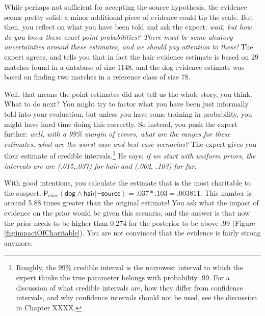 \documentclass[
  10pt,
  dvipsnames,enabledeprecatedfontcommands]{scrartcl}
\newcommand{\s}[1]{\mbox{$\mathsf{#1}$}}
\begin{document}
While perhaps not sufficient for accepting the source
hypothesis,
the evidence seems pretty solid: a minor additional piece of evidence
could tip the scale. But then, you reflect on what you have been told
and ask the expect:
\emph{wait, but how do you know these exact point probabilities? There must be some aleatory uncertainties around these estimates, and we should pay attention to these!}
The expert agrees, and tells you that in fact the hair evidence estimate
is based on 29 matches found in a database of size 1148, and the dog
evidence estimate was based on finding two matches in a reference class
of size 78.

Well, that means the point estimates did not tell us the whole story,
you think. What to do next?
You might try to factor what you have been just informally told into
your evaluation, but unless you have some training in probability, you
might have hard time doing this correctly. So instead, you push the
expert further:
\emph{well, with a 99\% margin of errors, what are the ranges for these estimates, what are the worst-case and best-case scenarios?}
The expert gives you their estimate of credible intervals.\footnote{Roughly,
  the 99\% credible interval is the narrowest interval to which the
  expert thinks the true parameter belongs with probability .99. For a
  discussion of what credible intervals are, how they differ from
  confidence intervals, and why confidence intervals should not be used,
  see the discussion in Chapter XXXX.} He says:
\emph{if we start with uniform priors, the intervals are are (.015,.037) for hair and (.002, .103) for fur.}

With good intentions, you calculate the estimate that is the most
charitable to the suspect.
\(\mathsf{P}_{char}(\s{dog}\wedge \s{hair} \vert \neg \s{source}) = .037 * .103 =.003811\).
This number is around 5.88 times greater than the original estimate! You
ask what the impact of evidence on the prior would be given this
scenario, and the answer is that now the prior needs to be higher than
0.274 for the posterior to be above .99 (Figure
\ref{fig:impactOfCharitable}). You are not convinced that the evidence
is fairly strong anymore.
\end{document}

